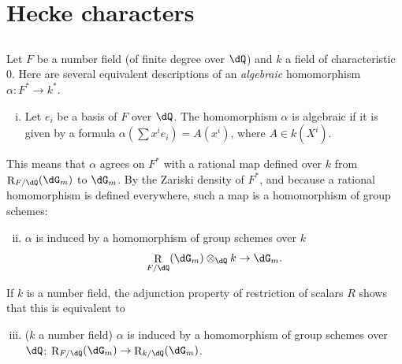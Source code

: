 \documentclass[oneside]{book}
\DeclareMathOperator{\res}{R} %
\newcounter{char}
\theoremstyle{sga-source}
\theoremstyle{sga-source-dash}
\theoremstyle{sga-source-dotdash}
\theoremstyle{sga-source-number-note-dash}
\theoremstyle{sga-source-note-number-dotdash}
\theoremstyle{sga-source-example-dotdash}
\theoremstyle{sga-source-inline-number}
\theoremstyle{sga-source-bare-number}
\theoremstyle{sga-source}
\newcommand{\PrintPage}[1]{}\newcommand{\MathPage}[1]{}\newcommand{\PrintCite}[2]{#1}\newcommand{\var}[3]{#2}
\begin{document}
\PrintPage{208}
\section{Hecke characters}\label{VI:5}





\subsection{}\label{VI:5-1}

Let $F$ be a number field (of finite degree over $\dQ$) \var{and $K$ a field}{and $k$ a field}{S45-SOL-0859} of 
characteristic $0$. Here are several equivalent descriptions of an 
\emph{algebraic} homomorphism $\alpha:F^\ast \to k^\ast$. 
\begin{enumerate}[(i)]
  \item Let $e_i$ be a basis of $F$ over $\dQ$. The homomorphism $\alpha$ is 
    algebraic if it is given by a formula 
    $\alpha(\sum x^i e_i) = A(x^i)$, where $A\in k(X^i)$. 
\end{enumerate}

This means that $\alpha$ agrees on $F^\ast$ with a rational map defined over $k$ 
from $\res_{F/\dQ}(\dG_m)$ to $\dG_m$. By the Zariski density of 
$F^\ast$, and because a rational homomorphism is defined everywhere, such 
a map is a homomorphism of group schemes: 
\begin{enumerate}[(i)]
\setcounter{enumi}{1}
  \item $\alpha$ is induced by a homomorphism of group schemes over $k$ 
    \[
      \res_{F/\dQ}(\dG_m)\otimes_\dQ k \to \dG_m \text{.} 
    \] 
\end{enumerate}

If $k$ is a number field, the adjunction property of restriction of 
scalars $R$ shows that this is equivalent to 
\begin{enumerate}[(i)]
\setcounter{enumi}{2}
  \item ($k$ a number field) $\alpha$ is induced by a homomorphism of 
    group schemes over $\dQ$: $\res_{F/\dQ}(\dG_m) \to \res_{k/\dQ}(\dG_m)$. 
\end{enumerate}
\end{document}
